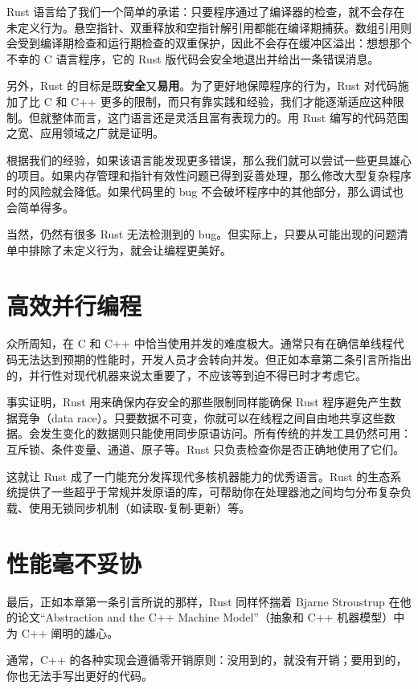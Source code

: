 Rust 语言给了我们一个简单的承诺：只要程序通过了编译器的检查，就不会存在未定义行为。悬空指针、双重释放和空指针解引用都能在编译期捕获。数组引用则会受到编译期检查和运行期检查的双重保护，因此不会存在缓冲区溢出：想想那个不幸的 C 语言程序，它的 Rust 版代码会安全地退出并给出一条错误消息。

另外，Rust 的目标是既\textbf{安全}又\textbf{易用}。为了更好地保障程序的行为，Rust 对代码施加了比 C 和 C++ 更多的限制，而只有靠实践和经验，我们才能逐渐适应这种限制。但就整体而言，这门语言还是灵活且富有表现力的。用 Rust 编写的代码范围之宽、应用领域之广就是证明。

根据我们的经验，如果该语言能发现更多错误，那么我们就可以尝试一些更具雄心的项目。如果内存管理和指针有效性问题已得到妥善处理，那么修改大型复杂程序时的风险就会降低。如果代码里的 bug 不会破坏程序中的其他部分，那么调试也会简单得多。

当然，仍然有很多 Rust 无法检测到的 bug。但实际上，只要从可能出现的问题清单中排除了未定义行为，就会让编程更美好。

\section{高效并行编程}

众所周知，在 C 和 C++ 中恰当使用并发的难度极大。通常只有在确信单线程代码无法达到预期的性能时，开发人员才会转向并发。但正如本章第二条引言所指出的，并行性对现代机器来说太重要了，不应该等到迫不得已时才考虑它。

事实证明，Rust 用来确保内存安全的那些限制同样能确保 Rust 程序避免产生数据竞争（data race）。只要数据不可变，你就可以在线程之间自由地共享这些数据。会发生变化的数据则只能使用同步原语访问。所有传统的并发工具仍然可用：互斥锁、条件变量、通道、原子等。Rust 只负责检查你是否正确地使用了它们。

这就让 Rust 成了一门能充分发挥现代多核机器能力的优秀语言。Rust 的生态系统提供了一些超乎于常规并发原语的库，可帮助你在处理器池之间均匀分布复杂负载、使用无锁同步机制（如读取-复制-更新）等。

\section{性能毫不妥协}

最后，正如本章第一条引言所说的那样，Rust 同样怀揣着 Bjarne Stroustrup 在他的论文“Abstraction and the C++ Machine Model”（抽象和 C++ 机器模型）中为 C++ 阐明的雄心。

\begin{myNote}
通常，C++ 的各种实现会遵循零开销原则：没用到的，就没有开销；要用到的，你也无法手写出更好的代码。
\end{myNote}

